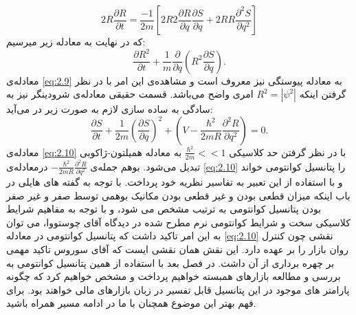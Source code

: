 \documentclass[a4paper,titlepage,12pt,fleqn,oneside]{report}
\begin{document}
\begin{equation}
2R\frac{\partial R}{\partial t} = \frac{-1}{2m} \left[2R2\frac{\partial R}{\partial q}\frac{\partial S}{\partial q}+2RR\frac{\partial^2 S}{\partial q^2}
\right]
\end{equation}
که در نهایت به معادله زیر میرسیم:
\begin{equation}
\frac{\partial R^2}{\partial t} + \frac{1}{m}\frac{\partial}{\partial q}\left(R^2\frac{\partial S}{\partial q}\right).
\label{eq:2.9} 
\end{equation} 
معادله‌ی 
\ref{eq:2.9}
به معادله پیوستگی نیز  معروف است و مشاهده‌ی این امر با در نظر گرفتن اینکه $R^2=|\psi^2|$ امری واضح می‌باشد. 
قسمت حقیقی معادله‌ی شرودینگر نیز به سادگی به ساده سازی لازم به صورت زیر در می‌آید:
\begin{equation}
\frac{\partial S}{\partial t} + \frac{1}{2m} \left(\frac{\partial S}{\partial q}\right)^2+
\left(V-\frac{\hbar^2}{2mR} \frac{\partial^2 R}{\partial q^2}\right)=0.
\label{eq:2.10}
\end{equation}
معادله‌ی 
\ref{eq:2.10}
با در نظر گرفتن حد کلاسیکی 
$\frac{\hbar^2}{2m} <<1$
به معادله همیلتون-ژاکوبی تبدیل می‌شود. بوهم جمله‌ی 
$-\frac{\hbar^2}{2mR} \frac{\partial^2 R}{\partial q^2}$
درمعادله‌ی 
\ref{eq:2.10}
را پتانسیل کوانتومی خواند و با استفاده از این تعبیر به تفاسیر نظریه خود پرداخت.  با توجه به گفته های هایلی در باب اینکه میزان قطعی بودن و غیر قطعی بودن مکانیک بوهمی توسط صفر و غیر صفر بودن پتانسیل کوانتومی به ترتیب مشخص می شود، و با توجه به مفاهیم شرایط کلاسیکی سخت و شرایط کوانتومی نرم مطرح شده در دیدگاه آقای چوستووا، می توان به این امر تاکید داشت که پتانسیل کوانتومی در معادله \ref{eq:2.10} نقشی چون کنترل روان بازار را بر عهده دارد. این نقش همان نقشی ایست که آقای سوروس تاکید مهمی بر چهره برداری از آن داشت. در فصل بعد با استفاده از همین پتانسیل کوانتومی به بررسی و مطالعه بازارهای همبسته خواهیم پرداخت و مشخص خواهیم کرد که چگونه پارامتر های موجود در این پتانسیل قابل تفسیر در زبان بازارهای مالی خواهند بود. برای فهم بهتر این موضوع همچنان با ما در ادامه مسیر همراه باشید.
\end{document}
